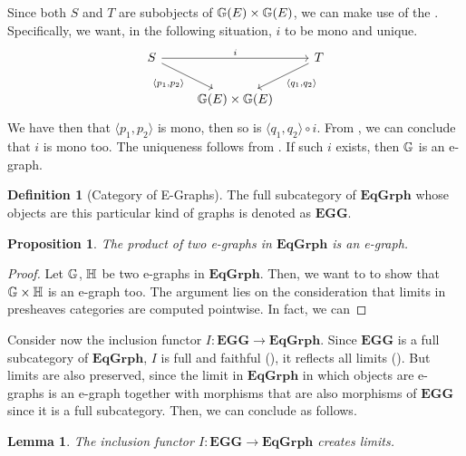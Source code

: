 \documentclass[a4paper, twoside,openright]{report}
\theoremstyle{plain}
\newtheorem{prop}[theorem]{Proposition}
\newtheorem{lemma}[theorem]{Lemma}
\theoremstyle{definition}
\newtheorem{definition}[theorem]{Definition}
\begin{document}
Since both $S$ and $T$ are subobjects of $\mathbb{G}(E) \times \mathbb{G}(E)$, we can make use of the . Specifically, we want, in the following situation, $i$ to be mono and unique.
\[
    \begin{tikzcd}
        S \arrow[rr, "i"] \arrow[dr, "{\langle p_1, p_2 \rangle}"swap] & & T \arrow[dl, "{\langle q_1, q_2\rangle}"] \\
        & \eqgraph{G}(E) \times \eqgraph{G}(E)
    \end{tikzcd}
\]
We have then that $\langle p_1, p_2 \rangle$ is mono, then so is $\langle q_1, q_2 \rangle \circ i$. From , we can conclude that $i$ is mono too. The uniqueness follows from . If such $i$ exists, then $\mathbb{G}$ is an e-graph.

\begin{definition}[Category of E-Graphs]\label{def:cat_of_eggs}
    The full subcategory of $\mathbf{EqGrph}$ whose objects are this particular kind of graphs is denoted as $\mathbf{EGG}$.
\end{definition}

\begin{prop}\label{prop:prod_of_EGGs_is_EGG}
    The product of two e-graphs in $\mathbf{EqGrph}$ is an e-graph.
\end{prop}

\begin{proof}
    Let $\mathbb{G}$, $\mathbb{H}$ be two e-graphs in $\mathbf{EqGrph}$. Then, we want to to show that $\mathbb{G \times H}$ is an e-graph too. The argument lies on the consideration that limits in presheaves categories are computed pointwise. In fact, we can 
\end{proof}

Consider now the inclusion functor $I: \mathbf{EGG} \rightarrow \mathbf{EqGrph}$. Since $\mathbf{EGG}$ is a full subcategory of $\mathbf{EqGrph}$, $I$ is full and faithful (), it reflects all limits (). But limits are also preserved, since the limit in $\mathbf{EqGrph}$ in which objects are e-graphs is an e-graph together with morphisms that are also morphisms of $\mathbf{EGG}$ since it is a full subcategory. Then, we can conclude as follows.

\begin{lemma}
    The inclusion functor $I: \mathbf{EGG \rightarrow EqGrph}$ creates limits.
\end{lemma}
\end{document}
